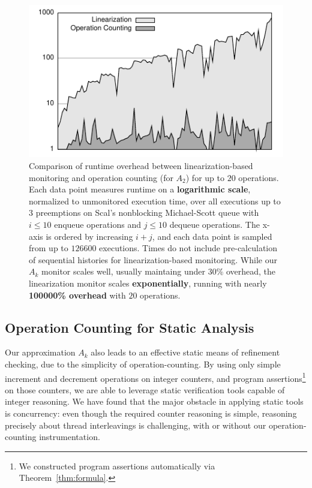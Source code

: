 \begin{figure}[t]
  \centering
  \includegraphics[width=\linewidth]{figures/lin-vs-counting-time}
  \caption{Comparison of runtime overhead between linearization-based monitoring
    and operation counting (for $A_2$) for up to $20$ operations. Each data
    point measures runtime on a \textbf{logarithmic scale}, normalized to
    unmonitored execution time, over all executions up to $3$ preemptions on
    Scal's nonblocking Michael-Scott queue with $i\!\le\!10$ enqueue operations
    and $j\!\le\!10$ dequeue operations. The x-axis is ordered by increasing
    $i\!+\!j$, and each data point is sampled from up to $126600$ executions.
    Times do not include pre-calculation of sequential histories for
    linearization-based monitoring. While our $A_k$ monitor scales well,
    usually maintaing under 30\% overhead, the linearization monitor scales
    \textbf{exponentially}, running with nearly \textbf{100000\% overhead}
    with $20$ operations.
  }
  \label{fig:data:runtime}
\end{figure}

\subsection{Operation Counting for Static Analysis}
\label{sec:exp:static}

Our approximation $A_k$ also leads to an effective static means of refinement
checking, due to the simplicity of operation-counting. By using only simple
increment and decrement operations on integer counters, and program
assertions\footnote{We constructed program assertions automatically via
Theorem~\ref{thm:formula}.} on those counters, we are able to leverage static
verification tools capable of integer reasoning. We have found that the major
obstacle in applying static tools is concurrency: even though the required
counter reasoning is simple, reasoning precisely about thread interleavings is
challenging, with or without our operation-counting instrumentation.

